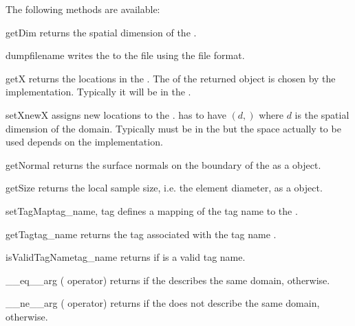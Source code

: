 \noindent The following methods are available:
\begin{methoddesc}[Domain]{getDim}{}
    returns the spatial dimension of the \Domain.
\end{methoddesc}
%
\begin{methoddesc}[Domain]{dump}{filename}
    writes the \Domain to the file  using the \netCDF file format.
\end{methoddesc}
%
\begin{methoddesc}[Domain]{getX}{}
    returns the locations in the \Domain. The \FunctionSpace of the returned
    \Data object is chosen by the \Domain implementation. Typically it will be
    in the \Function.
\end{methoddesc}
%
\begin{methoddesc}[Domain]{setX}{newX}
    assigns new locations to the \Domain.  has to have \Shape $(d,)$
    where $d$ is the spatial dimension of the domain. Typically 
    must be in the \ContinuousFunction but the space actually to be used
    depends on the \Domain implementation.
\end{methoddesc}
%
\begin{methoddesc}[Domain]{getNormal}{}
    returns the surface normals on the boundary of the \Domain as a \Data object.
\end{methoddesc}
%
\begin{methoddesc}[Domain]{getSize}{}
    returns the local sample size, i.e. the element diameter, as a \Data object.
\end{methoddesc}
%
\begin{methoddesc}[Domain]{setTagMap}{tag_name, tag}
    defines a mapping of the tag name  to the .
\end{methoddesc}
%
\begin{methoddesc}[Domain]{getTag}{tag_name}
    returns the tag associated with the tag name .
\end{methoddesc}
%
\begin{methoddesc}[Domain]{isValidTagName}{tag_name}
    returns \True if  is a valid tag name.
\end{methoddesc}
%
\begin{methoddesc}[Domain]{__eq__}{arg}
    (\PYTHON \var{==} operator) returns \True if the \Domain {}
    describes the same domain, \False otherwise.
\end{methoddesc}
%
\begin{methoddesc}[Domain]{__ne__}{arg}
    (\PYTHON \var{!=} operator) returns \True if the \Domain {} does
    not describe the same domain, \False otherwise.
\end{methoddesc}
